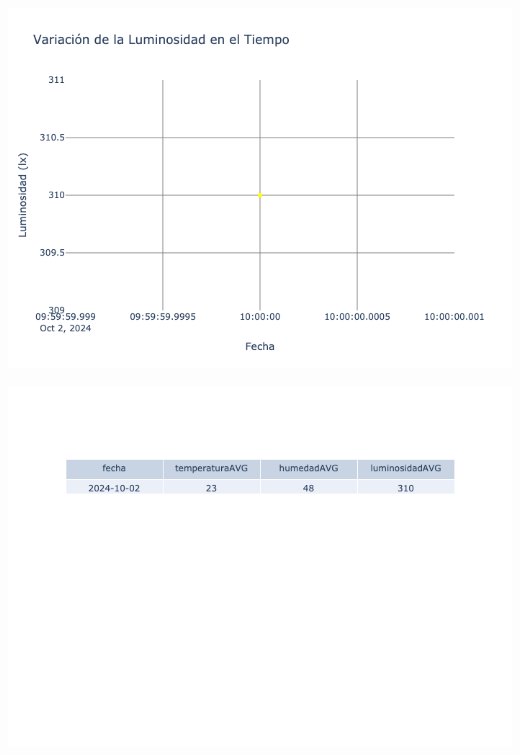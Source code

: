 \documentclass{article}
\begin{document}
    \noindent
    \begin{minipage}{0.48\textwidth}
        \centering
        \includegraphics[width=\textwidth]{../img/poli/LS103-90Dias-03-12-2024.png}
    \end{minipage}
    \hfill
    \begin{minipage}{0.48\textwidth}
        \centering
        \includegraphics[width=\textwidth]{../img/tables/CAVG103-90Dias-03-12-2024.png}
    \end{minipage}
    
\end{document}
